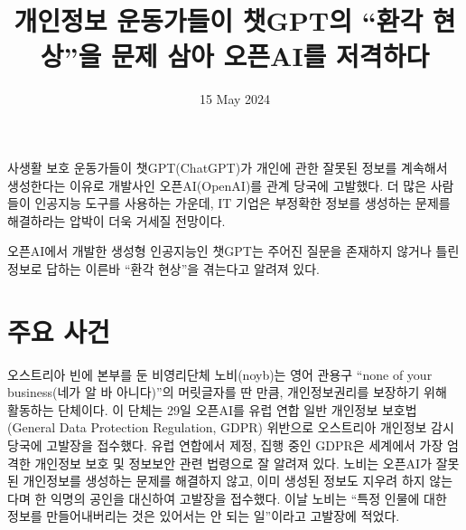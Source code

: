 \documentclass{translation}
\date{15 May 2024}
\title{개인정보 운동가들이 챗GPT의 ``환각 현상''을 문제 삼아 오픈AI를 저격하다}
\begin{document}
사생활 보호 운동가들이 챗GPT(ChatGPT)가 개인에 관한 잘못된 정보를 계속해서 생성한다는 이유로 개발사인 오픈AI(OpenAI)를 관계 당국에 고발했다.
더 많은 사람들이 인공지능 도구를 사용하는 가운데, IT 기업은 부정확한 정보를 생성하는 문제를 해결하라는 압박이 더욱 거세질 전망이다.
% 

오픈AI에서 개발한 생성형 인공지능인 챗GPT는 주어진 질문을 존재하지 않거나 틀린 정보로 답하는 이른바 ``환각 현상''을 겪는다고 알려져 있다.
% 

\section{주요 사건}
% 

오스트리아 빈에 본부를 둔 비영리단체 노비(noyb)는 영어 관용구 ``none of your business(네가 알 바 아니다)''의 머릿글자를 딴 만큼, 개인정보권리를 보장하기 위해 활동하는 단체이다.
이 단체는 29일 오픈AI를 유럽 연합 일반 개인정보 보호법(General Data Protection Regulation, GDPR) 위반으로 오스트리아 개인정보 감시 당국에 고발장을 접수했다.
유럽 연합에서 제정, 집행 중인 GDPR은 세계에서 가장 엄격한 개인정보 보호 및 정보보안 관련 법령으로 잘 알려져 있다.
노비는 오픈AI가 잘못된 개인정보를 생성하는 문제를 해결하지 않고, 이미 생성된 정보도 지우려 하지 않는다며 한 익명의 공인을 대신하여 고발장을 접수했다.
이날 노비는 ``특정 인물에 대한 정보를 만들어내버리는 것은 있어서는 안 되는 일''이라고 고발장에 적었다.
% 
\end{document}

